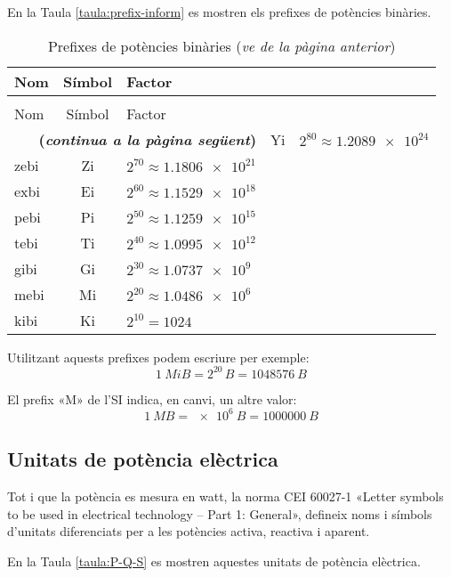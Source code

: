 En la Taula \vref{taula:prefix-inform} es mostren els prefixes de potències binàries.
\begin{longtable}[h]{lcl}
   \caption{\label{taula:prefix-inform} Prefixes de potències binàries}\\
   \toprule[1pt]
    Nom & Símbol  & Factor \\
   \midrule
   \endfirsthead
   \caption[]{Prefixes de potències binàries (\emph{ve de la pàgina anterior})}\\
   \toprule[1pt]
    Nom & Símbol  & Factor \\
   \midrule
   \endhead
   \midrule
   \multicolumn{3}{r}{\sffamily\bfseries\color{NavyBlue}(\emph{continua a la pàgina següent})}
   \endfoot
   \endlastfoot
   yobi & Yi   & $2^{80} \approx \num{1,2089e24}$ \\
   zebi & Zi   & $2^{70} \approx \num{1,1806e21}$ \\
   exbi & Ei   & $2^{60} \approx \num{1,1529e18}$ \\
   pebi & Pi   & $2^{50} \approx \num{1,1259e15}$ \\
   tebi & Ti   & $2^{40} \approx \num{1,0995e12}$ \\
   gibi & Gi   & $2^{30} \approx \num{1,0737e9}$  \\
   mebi & Mi   & $2^{20} \approx \num{1,0486e6}$ \\
   kibi & Ki   & $2^{10} = 1024$  \\
   \bottomrule[1pt]
\end{longtable}
        
   

Utilitzant aquests prefixes podem escriure per exemple:
\[\SI{1}{MiB} = 2^{20}\si{\,B} = \SI{1048576}{B}\]

El prefix «M» de l'SI indica, en canvi, un altre valor:
\[\SI{1}{MB} =\SI{e6}{B} = \SI{1000000}{B}\]


\subsection{Unitats de potència elèctrica}

Tot i que la potència es mesura en watt, la norma CEI 60027-1 «Letter symbols to be used in electrical technology -- Part 1: General», defineix noms i símbols d'unitats diferenciats per a les potències activa, reactiva i aparent.

En la Taula \vref{taula:P-Q-S} es mostren aquestes unitats de potència elèctrica.

